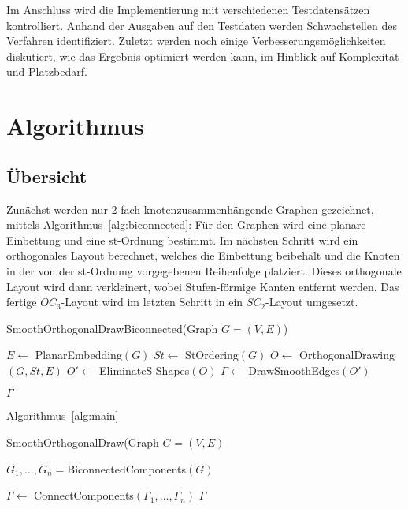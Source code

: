 \documentclass[a4paper]{scrreprt}
\theoremstyle{definition}
\begin{document}
Im Anschluss wird die Implementierung mit verschiedenen Testdatensätzen kontrolliert. Anhand
der Ausgaben auf den Testdaten werden Schwachstellen des Verfahren identifiziert. 
Zuletzt werden noch einige Verbesserungsmöglichkeiten diskutiert, wie das Ergebnis
optimiert werden kann, im Hinblick auf Komplexität und Platzbedarf.

\chapter{Algorithmus}

\section{Übersicht}

Zunächst werden nur 2-fach knotenzusammenhängende Graphen gezeichnet, mittels Algorithmus~\ref{alg:biconnected}: Für den Graphen wird eine planare Einbettung und eine st-Ordnung bestimmt. Im nächsten Schritt wird ein orthogonales Layout berechnet, welches die Einbettung beibehält und die Knoten in der von der st-Ordnung vorgegebenen Reihenfolge platziert. Dieses orthogonale Layout wird dann verkleinert, wobei Stufen-förmige Kanten entfernt werden. Das fertige $OC_3$-Layout wird im letzten Schritt in ein $SC_2$-Layout umgesetzt.

\begin{algorithm}[ht]
  \caption{SmoothOrthogonalDrawBiconnected(Graph $G = (V,E)$)}
  \label{alg:biconnected}
  
  $E \leftarrow$ PlanarEmbedding$(G)$ \;
  $St \leftarrow$ StOrdering$(G)$ \;
  $O \leftarrow$ OrthogonalDrawing$(G,St,E)$ \;
  $O' \leftarrow$ EliminateS-Shapes$(O)$ \;
  $\Gamma \leftarrow$ DrawSmoothEdges$(O')$ \;
  
  \Return $\Gamma$
\end{algorithm}


Algorithmus~\ref{alg:main}

\begin{algorithm}[ht]
  \caption{SmoothOrthogonalDraw(Graph $G = (V,E)$}
  \label{alg:main}
  
  $G_1, \dots, G_n = $BiconnectedComponents$(G)$ \;
  
  $\Gamma \leftarrow$ ConnectComponents$(\Gamma_1, \dots, \Gamma_n)$ \;
  \Return $\Gamma$
\end{algorithm}
\end{document}
